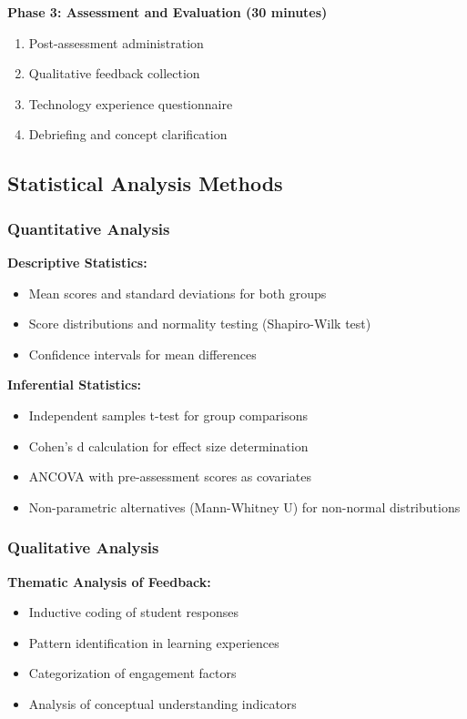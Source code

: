 \documentclass[12pt,journal,onecolumn]{IEEEtran}
\begin{document}
\textbf{Phase 3: Assessment and Evaluation (30 minutes)}
\begin{enumerate}
\item Post-assessment administration
\item Qualitative feedback collection
\item Technology experience questionnaire
\item Debriefing and concept clarification
\end{enumerate}

\subsection{Statistical Analysis Methods}

\subsubsection{Quantitative Analysis}

\textbf{Descriptive Statistics:}
\begin{itemize}
\item Mean scores and standard deviations for both groups
\item Score distributions and normality testing (Shapiro-Wilk test)
\item Confidence intervals for mean differences
\end{itemize}

\textbf{Inferential Statistics:}
\begin{itemize}
\item Independent samples t-test for group comparisons
\item Cohen's d calculation for effect size determination
\item ANCOVA with pre-assessment scores as covariates
\item Non-parametric alternatives (Mann-Whitney U) for non-normal distributions
\end{itemize}

\subsubsection{Qualitative Analysis}

\textbf{Thematic Analysis of Feedback:}
\begin{itemize}
\item Inductive coding of student responses
\item Pattern identification in learning experiences
\item Categorization of engagement factors
\item Analysis of conceptual understanding indicators
\end{itemize}
\end{document}

